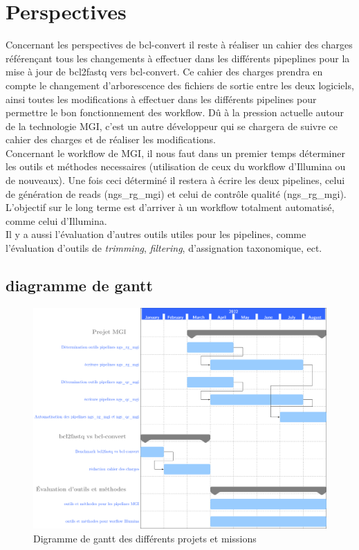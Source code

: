  
\section{Perspectives}
Concernant les perspectives de bcl-convert il reste à réaliser un cahier des charges référençant tous les changements à effectuer dans les différents pipeplines pour la mise à jour de bcl2fastq vers bcl-convert. Ce cahier des charges prendra en compte le changement d'arborescence des fichiers de sortie entre les deux logiciels, ainsi toutes les modifications à effectuer dans les différents pipelines pour permettre le bon fonctionnement des workflow. Dû à la pression actuelle autour de la technologie MGI, c'est un autre développeur qui se chargera de suivre ce cahier des charges et de réaliser les modifications.\\

Concernant le workflow de MGI, il nous faut dans un premier temps déterminer les outils et méthodes necessaires (utilisation de ceux du workflow d'Illumina ou de nouveaux). Une fois ceci déterminé il restera à écrire les deux pipelines, celui de génération de reads (ngs\_rg\_mgi) et celui de contrôle qualité (ngs\_rg\_mgi). L'objectif sur le long terme est d'arriver à un workflow totalment automatisé, comme celui d'Illumina.\\

Il y a aussi l'évaluation d'autres outils utiles pour les pipelines, comme l'évaluation d'outils de \emph{trimming}, \emph{filtering}, d'assignation taxonomique, ect.

\newpage
\subsection{diagramme de gantt}
\begin{figure}[H]
    \centering
    \includegraphics[width=1\textwidth]{digramme_gant/diag_gantt.png}
    \caption{Digramme de gantt des différents projets et missions}
    \label{diag-gantt}
\end{figure}